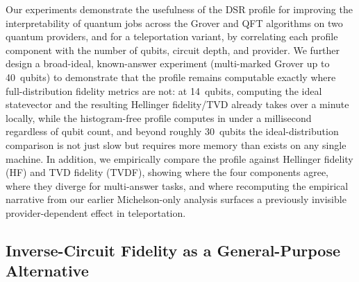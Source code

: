 Our experiments demonstrate the usefulness of the DSR profile for improving the interpretability of quantum jobs across the Grover and QFT algorithms on two quantum providers, and for a teleportation variant, by correlating each profile component with the number of qubits, circuit depth, and provider. We further design a broad-ideal, known-answer experiment (multi-marked Grover up to 40~qubits) to demonstrate that the profile remains computable exactly where full-distribution fidelity metrics are not: at 14~qubits, computing the ideal statevector and the resulting Hellinger fidelity/TVD already takes over a minute locally, while the histogram-free profile computes in under a millisecond regardless of qubit count, and beyond roughly 30~qubits the ideal-distribution comparison is not just slow but requires more memory than exists on any single machine. In addition, we empirically compare the profile against Hellinger fidelity (HF) and TVD fidelity (TVDF), showing where the four components agree, where they diverge for multi-answer tasks, and where recomputing the empirical narrative from our earlier Michelson-only analysis surfaces a previously invisible provider-dependent effect in teleportation.



\subsection{Inverse-Circuit Fidelity as a General-Purpose Alternative}
\label{sec:inverse-circuit}

